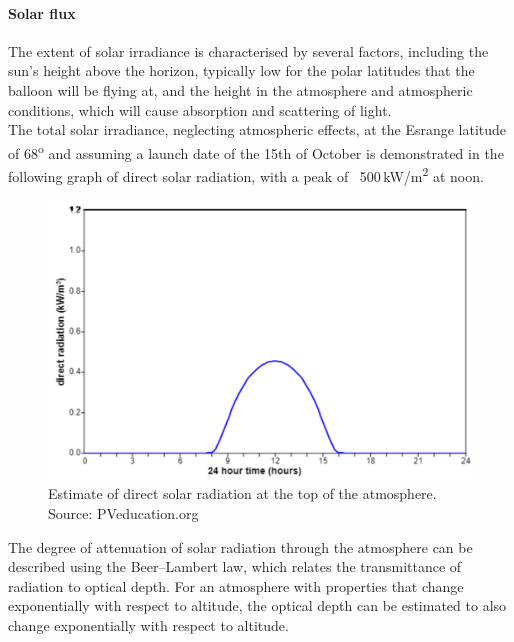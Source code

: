 

\paragraph{Solar flux}

The extent of solar irradiance is characterised by several factors, including the sun’s height above the horizon, typically low for the polar latitudes that the balloon will be flying at, and the height in the atmosphere and atmospheric conditions, which will cause absorption and scattering of light. \\
The total solar irradiance, neglecting atmospheric effects, at the Esrange latitude of 68\textsuperscript{o} and assuming a launch date of the 15th of October is demonstrated in the following graph of direct solar radiation, with a peak of ~500\,kW/m\textsuperscript{2} at noon.\\

	\begin{figure}[h!]
    \centering
    \includegraphics[scale=0.6]{4-experiment-design/img/mechanical/directradiation.png}
	\caption{Estimate of direct solar radiation at the top of the atmosphere. Source: PVeducation.org}
	\label{fig:directradiation}
	\end{figure}

The degree of attenuation of solar radiation through the atmosphere can be described using the Beer–Lambert law, which relates the transmittance of radiation to optical depth. For an atmosphere with properties that change exponentially with respect to altitude, the optical depth can be estimated to also change exponentially with respect to altitude. \\

